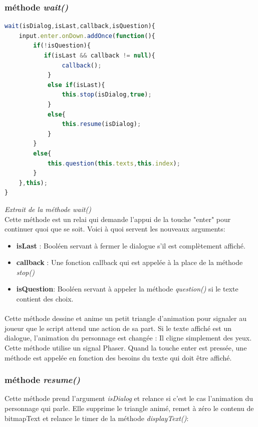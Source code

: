 \documentclass[11pt]{article}
\begin{document}
\subsubsection{méthode \textit{wait()}}
\begin{lstlisting}[language=JavaScript]
wait(isDialog,isLast,callback,isQuestion){ 
    input.enter.onDown.addOnce(function(){ 
    	if(!isQuestion){
     	   if(isLast && callback != null){
       	     	callback();
       	 	}
        	else if(isLast){
            	this.stop(isDialog,true);
        	}
        	else{
            	this.resume(isDialog);
        	}
    	}
    	else{
        	this.question(this.texts,this.index);
    	}
	},this);
}
\end{lstlisting} 
\textit{Extrait de la méthode wait()}\\ Cette méthode est un relai qui demande l'appui de la touche "enter" pour continuer quoi que se soit. Voici à quoi servent les nouveaux arguments: 
\begin{itemize}
\item \textbf{isLast} : Booléen servant à fermer le dialogue s'il est complètement affiché.
\item \textbf{callback} : Une fonction callback qui est appelée à la place de la méthode \textit{stop()}
\item \textbf{isQuestion}: Booléen servant à appeler la méthode \textit{question()} si le texte contient des choix.
\end{itemize}
\paragraph{}
Cette méthode dessine et anime un petit triangle d'animation pour signaler au joueur que le script attend une action de sa part. Si le texte affiché est un dialogue, l'animation du personnage est changée : Il cligne simplement des yeux. Cette méthode utilise un signal Phaser. Quand la touche enter est pressée, une méthode est appelée en fonction des besoins du texte qui doit être affiché.
\subsubsection{méthode \textit{resume()}}
Cette méthode prend l'argument \textit{isDialog} et relance si c'est le cas l'animation du personnage qui parle. Elle supprime le triangle animé, remet à zéro le contenu de bitmapText et relance le timer de la méthode \textit{displayText()}:
\end{document}

